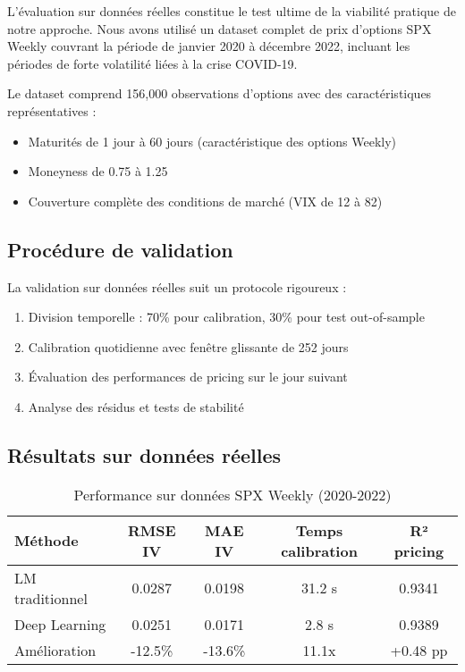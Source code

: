 L'évaluation sur données réelles constitue le test ultime de la viabilité pratique de notre approche. Nous avons utilisé un dataset complet de prix d'options SPX Weekly couvrant la période de janvier 2020 à décembre 2022, incluant les périodes de forte volatilité liées à la crise COVID-19.

Le dataset comprend 156,000 observations d'options avec des caractéristiques représentatives :
\begin{itemize}
\item Maturités de 1 jour à 60 jours (caractéristique des options Weekly)
\item Moneyness de 0.75 à 1.25
\item Couverture complète des conditions de marché (VIX de 12 à 82)
\end{itemize}

\subsection{Procédure de validation}

La validation sur données réelles suit un protocole rigoureux :

\begin{enumerate}
\item Division temporelle : 70\% pour calibration, 30\% pour test out-of-sample
\item Calibration quotidienne avec fenêtre glissante de 252 jours
\item Évaluation des performances de pricing sur le jour suivant
\item Analyse des résidus et tests de stabilité
\end{enumerate}

\subsection{Résultats sur données réelles}

\begin{table}[H]
\centering
\caption{Performance sur données SPX Weekly (2020-2022)}
\begin{tabular}{@{}lcccc@{}}
\toprule
\textbf{Méthode} & \textbf{RMSE IV} & \textbf{MAE IV} & \textbf{Temps calibration} & \textbf{R² pricing} \\
\midrule
LM traditionnel & 0.0287 & 0.0198 & 31.2 s & 0.9341 \\
Deep Learning & 0.0251 & 0.0171 & 2.8 s & 0.9389 \\
Amélioration & -12.5\% & -13.6\% & 11.1x & +0.48 pp \\
\bottomrule
\end{tabular}
\end{table}

